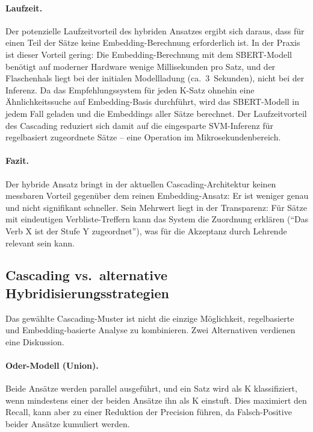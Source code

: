 \paragraph{Laufzeit.}
Der potenzielle Laufzeitvorteil des hybriden Ansatzes ergibt sich daraus, dass für einen Teil der Sätze keine Embedding-Berechnung erforderlich ist.
In der Praxis ist dieser Vorteil gering: Die Embedding-Berechnung mit dem SBERT-Modell benötigt auf moderner Hardware wenige Millisekunden pro Satz, und der Flaschenhals liegt bei der initialen Modellladung (ca.\ 3~Sekunden), nicht bei der Inferenz.
Da das Empfehlungssystem für jeden K-Satz ohnehin eine Ähnlichkeitssuche auf Embedding-Basis durchführt, wird das SBERT-Modell in jedem Fall geladen und die Embeddings aller Sätze berechnet.
Der Laufzeitvorteil des Cascading reduziert sich damit auf die eingesparte SVM-Inferenz für regelbasiert zugeordnete Sätze -- eine Operation im Mikrosekundenbereich.

\paragraph{Fazit.}
Der hybride Ansatz bringt in der aktuellen Cascading-Architektur keinen messbaren Vorteil gegenüber dem reinen Embedding-Ansatz: Er ist weniger genau und nicht signifikant schneller.
Sein Mehrwert liegt in der Transparenz: Für Sätze mit eindeutigen Verbliste-Treffern kann das System die Zuordnung erklären (\enquote{Das Verb X ist der Stufe Y zugeordnet}), was für die Akzeptanz durch Lehrende relevant sein kann.

\subsection{Cascading vs.\ alternative Hybridisierungsstrategien}\label{sec:cascading-alternativen}

Das gewählte Cascading-Muster ist nicht die einzige Möglichkeit, regelbasierte und Embedding-basierte Analyse zu kombinieren.
Zwei Alternativen verdienen eine Diskussion.

\paragraph{Oder-Modell (Union).}
Beide Ansätze werden parallel ausgeführt, und ein Satz wird als K klassifiziert, wenn mindestens einer der beiden Ansätze ihn als K einstuft.
Dies maximiert den Recall, kann aber zu einer Reduktion der Precision führen, da Falsch-Positive beider Ansätze kumuliert werden.


